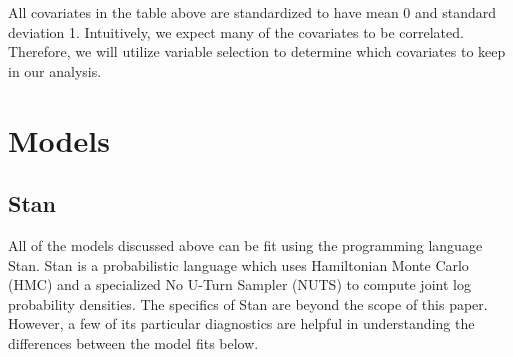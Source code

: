 \documentclass[
]{article}
\begin{document}
All covariates in the table above are standardized to have mean 0 and
standard deviation 1. Intuitively, we expect many of the covariates to
be correlated. Therefore, we will utilize variable selection to
determine which covariates to keep in our analysis.

\hypertarget{models}{%
\section{Models}\label{models}}

\hypertarget{stan}{%
\subsection{Stan}\label{stan}}

All of the models discussed above can be fit using the programming
language Stan. Stan is a probabilistic language which uses Hamiltonian
Monte Carlo (HMC) and a specialized No U-Turn Sampler (NUTS) to compute
joint log probability densities. The specifics of Stan are beyond the
scope of this paper. However, a few of its particular diagnostics are
helpful in understanding the differences between the model fits below.
\end{document}
